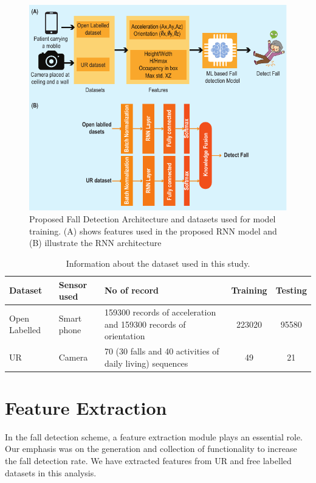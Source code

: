 \begin{figure}[!ht]
    \centering
    \includegraphics[scale=1.0]{Chap4/Fig03 B245.pdf}
    \caption{Proposed Fall Detection Architecture and datasets used for model training. (A) shows features used in the proposed RNN model and (B) illustrate the RNN architecture}
    \label{fig:Fall_model}
\end{figure}




\begin{table}[!ht]
    \centering
    \scriptsize
    \begin{tabular}{lp{1in}p{1.5in}cc}\toprule
        Dataset & Sensor used &No of record & Training & Testing\\ \midrule
         Open Labelled
& Smart phone  &159300 records of acceleration
and 159300 records of orientation&223020 &95580\\ \midrule
        UR & Camera &70 (30 falls and 40 activities of daily living) sequences& 49&21\\ \bottomrule
    \end{tabular}
    \caption{Information about the dataset used in this study.}
    \label{resulttab:1}
\end{table}




\section{Feature Extraction}
In the fall detection scheme, a feature extraction module plays an essential role. Our emphasis was on the generation and collection of functionality to increase the fall detection rate. We have extracted features from UR and free labelled datasets in this analysis.

